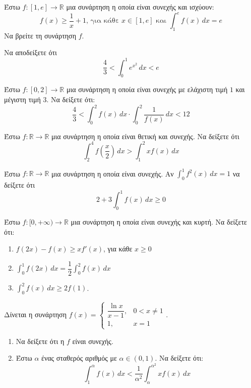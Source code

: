 \documentclass{../presentation}
\begin{document}
\begin{askisi}
  Έστω $f:[1,e]\to \mathbb{R}$ μια συνάρτηση η οποία είναι συνεχής και ισχύουν:
  $$f(x)\ge \frac{1}{x}+1 \text{, για κάθε } x\in [1,e] \text{ και } \int_{1}^{e}f(x)\, dx=e$$
  Να βρείτε τη συνάρτηση $f$.
\end{askisi}

\begin{askisi}
  Να αποδείξετε ότι $$\frac{4}{3}<\int_{0}^{1}e^{x^2}\, dx<e$$
\end{askisi}

\begin{askisi}
  Έστω $f:[0,2]\to \mathbb{R}$ μια συνάρτηση η οποία είναι συνεχής με ελάχιστη τιμή $1$ και μέγιστη τιμή $3$. Να δείξετε ότι:
  $$\frac{4}{3}<\int_{0}^{2}f(x)\, dx\cdot \int_{0}^{2}\frac{1}{f(x)}\, dx<12$$
\end{askisi}

\begin{askisi}
  Έστω $f:\mathbb{R}\to \mathbb{R}$ μια συνάρτηση η οποία είναι θετική και συνεχής. Να δείξετε ότι
  $$\int_{2}^{4}f(\frac{x}{2})\, dx > \int_{1}^{2}xf(x)\, dx$$
\end{askisi}

\begin{askisi}
  Έστω $f:\mathbb{R}\to \mathbb{R}$ μια συνάρτηση η οποία είναι συνεχής. Αν $\int_{0}^{1}f^2(x)\, dx=1$ να δείξετε ότι $$2+3\int_{0}^{1}f(x)\, dx \ge 0$$
\end{askisi}

\begin{askisi}
  Έστω $f:[0, +\infty)\to \mathbb{R}$ μια συνάρτηση η οποία είναι συνεχής και κυρτή. Να δείξετε ότι:
  \begin{enumerate}[<+->]
    \item $f(2x)-f(x)\ge xf'(x)$, για κάθε $x\ge 0$
    \item $\int_{0}^{1}f(2x)\, dx=\dfrac{1}{2}\int_{0}^{2}f(x)\, dx$
    \item $\int_{0}^{2}f(x)\, dx\ge 2f(1)$.
  \end{enumerate}
\end{askisi}

\begin{askisi}
  Δίνεται η συνάρτηση $f(x)=\begin{cases}
      \dfrac{\ln x}{x-1}, & 0<x\ne 1 \\
      1,                  & x=1
    \end{cases}$.
  \begin{enumerate}[<+->]
    \item Να δείξετε ότι η $f$ είναι συνεχής.
    \item Έστω $α$ ένας σταθερός αριθμός με $α\in (0,1)$. Να δείξετε ότι:
          $$\int_{1}^{α}f(x)\, dx<\frac{1}{α^2} \int_{α}^{α^2}xf(x)\, dx$$
  \end{enumerate}
\end{askisi}
\end{document}

